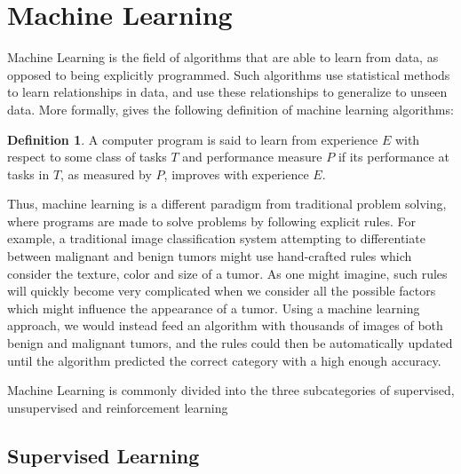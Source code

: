 \documentclass[UKenglish]{uiomasterthesis} %
\theoremstyle{definition}
\newtheorem*{definition}{Definition}
\begin{document}
\section{Machine Learning}

Machine Learning is the field of algorithms that are able to learn from data, as opposed to being explicitly programmed. Such algorithms use statistical methods to learn relationships in data, and use these relationships to generalize to unseen data. More formally, \cite{mitchell} gives the following definition of machine learning algorithms:

\begin{definition}
A computer program is said to learn from experience $E$ with respect to some class of tasks $T$ and performance measure $P$ if its performance at tasks in $T$, as measured by $P$, improves with experience $E$.
\end{definition}

Thus, machine learning is a different paradigm from traditional problem solving, where programs are made to solve problems by following explicit rules. For example, a traditional image classification system attempting to differentiate between malignant and benign tumors might use hand-crafted rules which consider the texture, color and size of a tumor. As one might imagine, such rules will quickly become very complicated when we consider all the possible factors which might influence the appearance of a tumor. Using a machine learning approach, we would instead feed an algorithm with thousands of images of both benign and malignant tumors, and the rules could then be automatically updated until the algorithm predicted the correct category with a high enough accuracy.

Machine Learning is commonly divided into the three subcategories of supervised, unsupervised and reinforcement learning


\subsection{Supervised Learning}
\end{document}
